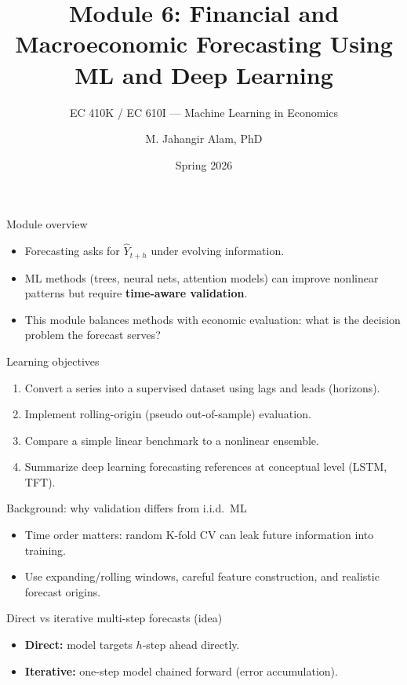 \documentclass[aspectratio=169,11pt]{beamer}
\title[Forecasting]{Module 6: Financial and Macroeconomic Forecasting Using ML and Deep Learning}
\subtitle{EC 410K / EC 610I --- Machine Learning in Economics}
\author{M. Jahangir Alam, PhD}
\institute{Wilfrid Laurier University}
\date{Spring 2026}
\begin{document}
\begin{frame}[plain]
  \titlepage
\end{frame}

\begin{frame}{Module overview}
  \begin{itemize}
    \item Forecasting asks for \(\widehat{Y}_{t+h}\) under evolving information.
    \item ML methods (trees, neural nets, attention models) can improve nonlinear patterns but require \textbf{time-aware validation}.
    \item This module balances methods with economic evaluation: what is the decision problem the forecast serves?
  \end{itemize}
\end{frame}

\begin{frame}{Learning objectives}
  \begin{enumerate}
    \item Convert a series into a supervised dataset using lags and leads (horizons).
    \item Implement rolling-origin (pseudo out-of-sample) evaluation.
    \item Compare a simple linear benchmark to a nonlinear ensemble.
    \item Summarize deep learning forecasting references at conceptual level (LSTM, TFT).
  \end{enumerate}
\end{frame}

\begin{frame}{Background: why validation differs from i.i.d.\ ML}
  \begin{itemize}
    \item Time order matters: random K-fold CV can leak future information into training.
    \item Use expanding/rolling windows, careful feature construction, and realistic forecast origins.
  \end{itemize}
\end{frame}

\begin{frame}{Direct vs iterative multi-step forecasts (idea)}
  \begin{itemize}
    \item \textbf{Direct:} model targets \(h\)-step ahead directly.
    \item \textbf{Iterative:} one-step model chained forward (error accumulation).
  \end{itemize}
\end{frame}
\end{document}
